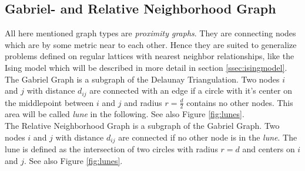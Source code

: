 
\subsection{Gabriel- and Relative Neighborhood Graph}
\label{ssec:graphtypes}
    All here mentioned graph types are \emph{proximity graphs}. They are
    connecting nodes which are by some metric near to each other.
    Hence they are suited to generalize problems defined on regular
    lattices with nearest neighbor relationships, like the Ising model
    which will be described in more detail in section
    \ref{ssec:isingmodel}.\\
    The Gabriel Graph \cite{Gabriel1969} is a subgraph of the
    Delaunay Triangulation. Two nodes \(i\) and \(j\) with distance
    \(d_{ij}\) are connected with an edge if a circle with it's
    center on the middlepoint between \(i\) and \(j\) and radius
    \(r = \frac d 2\) contains no other nodes. This area will be
    called \emph{lune} in the following. See also Figure
    \ref{fig:lunes}.\\
    The Relative Neighborhood Graph \cite{Toussaint1980} is a
    subgraph of the Gabriel Graph. Two nodes \(i\) and \(j\) with
    distance \(d_{ij}\) are connected if no other node is in the
    \emph{lune}. The lune is defined as the intersection of two
    circles with radius \(r = d\) and centers on \(i\) and \(j\).
    See also Figure \ref{fig:lunes}.
